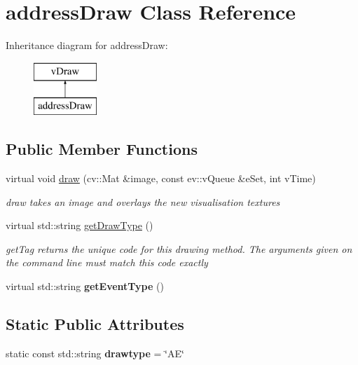 \hypertarget{classaddressDraw}{}\section{address\+Draw Class Reference}
\label{classaddressDraw}
Inheritance diagram for address\+Draw\+:\begin{figure}[H]
\begin{center}
\leavevmode
\includegraphics[height=2.000000cm]{classaddressDraw}
\end{center}
\end{figure}
\subsection*{Public Member Functions}
\begin{DoxyCompactItemize}
\item 
virtual void \hyperlink{classaddressDraw_a2eb36efe557d39dfcc49bd5250ec3d6b}{draw} (cv\+::\+Mat \&image, const ev\+::v\+Queue \&e\+Set, int v\+Time)
\begin{DoxyCompactList}\small\item\em draw takes an image and overlays the new visualisation textures \end{DoxyCompactList}\item 
virtual std\+::string \hyperlink{classaddressDraw_a1b1ef76932c71300e87353cc266eb322}{get\+Draw\+Type} ()
\begin{DoxyCompactList}\small\item\em get\+Tag returns the unique code for this drawing method. The arguments given on the command line must match this code exactly \end{DoxyCompactList}\item 
virtual std\+::string {\bfseries get\+Event\+Type} ()\hypertarget{classaddressDraw_a58dc1feb45fb9374b8e89bfb722019cd}{}\label{classaddressDraw_a58dc1feb45fb9374b8e89bfb722019cd}

\end{DoxyCompactItemize}
\subsection*{Static Public Attributes}
\begin{DoxyCompactItemize}
\item 
static const std\+::string {\bfseries drawtype} = \char`\"{}AE\char`\"{}\hypertarget{classaddressDraw_a328ccdbe446c69685affbf11eaac806f}{}\label{classaddressDraw_a328ccdbe446c69685affbf11eaac806f}

\end{DoxyCompactItemize}
